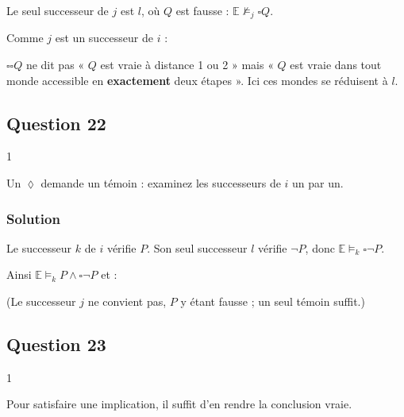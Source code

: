 \documentclass[11pt,a4paper]{article}
\providecommand{\Box}{\square}
\providecommand{\Diamond}{\lozenge}
\newcommand{\equationajustee}[1]{%
  \sbox{\boiteequation}{$\displaystyle #1$}%
  \ifdim\wd\boiteequation>\linewidth
    \[\resizebox{\linewidth}{!}{\usebox{\boiteequation}}\]%
  \else
    \[#1\]%
  \fi}
\begin{document}
Le seul successeur de \(j\) est \(l\), où \(Q\) est fausse : \(\mathbb E\not\models_j\Box Q\).

Comme \(j\) est un successeur de \(i\) :

\equationajustee{\boxed{\mathbb E\not\models_i\Box\Box Q}}

\begin{piege}

\(\Box\Box Q\) ne dit pas « \(Q\) est vraie à distance 1 ou 2 » mais « \(Q\) est vraie dans tout monde accessible en \textbf{exactement} deux étapes ». Ici ces mondes se réduisent à \(l\).

\end{piege}

\hypertarget{question-22}{%
\subsection{Question 22}\label{question-22}}

\begin{indication}{1}

Un \(\Diamond\) demande un témoin : examinez les successeurs de \(i\) un par un.

\end{indication}

\hypertarget{solution-21}{%
\subsubsection{Solution}\label{solution-21}}

Le successeur \(k\) de \(i\) vérifie \(P\). Son seul successeur \(l\) vérifie \(\neg P\), donc \(\mathbb E\models_k\Box\neg P\).

Ainsi \(\mathbb E\models_k P\wedge\Box\neg P\) et :

\equationajustee{\boxed{\mathbb E\models_i\Diamond(P\wedge\Box\neg P)}}

(Le successeur \(j\) ne convient pas, \(P\) y étant fausse ; un seul témoin suffit.)

\hypertarget{question-23}{%
\subsection{Question 23}\label{question-23}}

\begin{indication}{1}

Pour satisfaire une implication, il suffit d'en rendre la conclusion vraie.

\end{indication}
\end{document}
